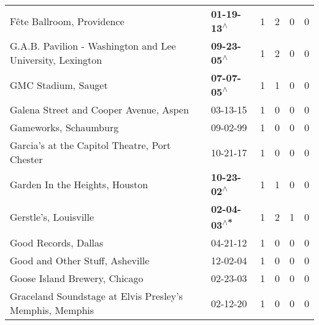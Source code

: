 \begin{supertabular}{p{0.4\textwidth}p{0.3\textwidth}p{0.05\textwidth}p{0.05\textwidth}p{0.05\textwidth}p{0.05\textwidth}}
                                                    Fête Ballroom, Providence &                                                 \textbf{01-19-13\textsuperscript{$\wedge$}} &  1 &  2 &  0 &  0 \\
                   G.A.B. Pavilion - Washington and Lee University, Lexington &                                                 \textbf{09-23-05\textsuperscript{$\wedge$}} &  1 &  2 &  0 &  0 \\
                                                          GMC Stadium, Sauget &                                                 \textbf{07-07-05\textsuperscript{$\wedge$}} &  1 &  1 &  0 &  0 \\
                                       Galena Street and Cooper Avenue, Aspen &                                                                  03-13-15\textsuperscript{} &  1 &  0 &  0 &  0 \\
                                                        Gameworks, Schaumburg &                                                                  09-02-99\textsuperscript{} &  1 &  0 &  0 &  0 \\
                                Garcia’s at the Capitol Theatre, Port Chester &                                                                  10-21-17\textsuperscript{} &  1 &  0 &  0 &  0 \\
                                               Garden In the Heights, Houston &                                                 \textbf{10-23-02\textsuperscript{$\wedge$}} &  1 &  1 &  0 &  0 \\
                                                        Gerstle's, Louisville &                                                \textbf{02-04-03\textsuperscript{$\wedge$*}} &  1 &  2 &  1 &  0 \\
                                                         Good Records, Dallas &                                                                  04-21-12\textsuperscript{} &  1 &  0 &  0 &  0 \\
                                              Good and Other Stuff, Asheville &                                                                  12-02-04\textsuperscript{} &  1 &  0 &  0 &  0 \\
                                                Goose Island Brewery, Chicago &                                                                  02-23-03\textsuperscript{} &  1 &  0 &  0 &  0 \\
                     Graceland Soundstage at Elvis Presley’s Memphis, Memphis &                                                                  02-12-20\textsuperscript{} &  1 &  0 &  0 &  0 \\

\end{supertabular}
